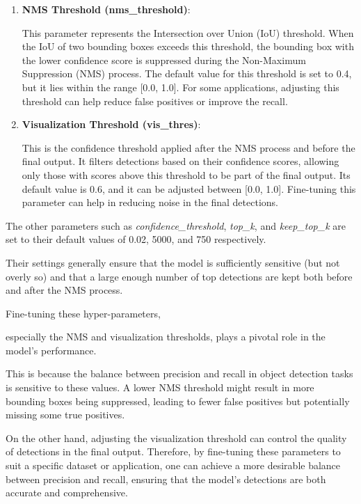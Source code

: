 \documentclass{article}
\begin{document}
\begin{enumerate}
    \item \textbf{NMS Threshold (nms\_threshold)}: 
    
    This parameter represents the Intersection over Union (IoU) threshold. When the IoU of two bounding boxes exceeds this threshold, the bounding box with the lower confidence score is suppressed during the Non-Maximum Suppression (NMS) process. The default value for this threshold is set to 0.4, but it lies within the range [0.0, 1.0]. For some applications, adjusting this threshold can help reduce false positives or improve the recall.
    
    \item \textbf{Visualization Threshold (vis\_thres)}: 
    
    This is the confidence threshold applied after the NMS process and before the final output. It filters detections based on their confidence scores, allowing only those with scores above this threshold to be part of the final output. Its default value is 0.6, and it can be adjusted between [0.0, 1.0]. Fine-tuning this parameter can help in reducing noise in the final detections.
\end{enumerate}

The other parameters such as \textit{confidence\_threshold}, \textit{top\_k}, and \textit{keep\_top\_k} are set to their default values of 0.02, 5000, and 750 respectively. 

Their settings generally ensure that the model is sufficiently sensitive (but not overly so) and that a large enough number of top detections are kept both before and after the NMS process.

Fine-tuning these hyper-parameters, 

especially the NMS and visualization thresholds, plays a pivotal role in the model's performance. 

This is because the balance between precision and recall in object detection tasks is sensitive to these values. A lower NMS threshold might result in more bounding boxes being suppressed, leading to fewer false positives but potentially missing some true positives. 

On the other hand, adjusting the visualization threshold can control the quality of detections in the final output. Therefore, by fine-tuning these parameters to suit a specific dataset or application, one can achieve a more desirable balance between precision and recall, ensuring that the model's detections are both accurate and comprehensive.
\end{document}
